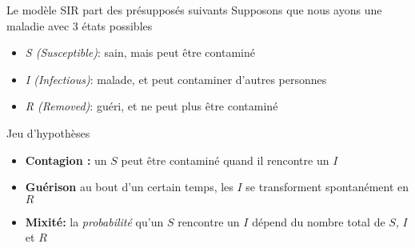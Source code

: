 \documentclass[10pt]{beamer}
\begin{document}
\begin{frame}{Le modèle SIR part des présupposés suivants}
  Supposons que nous ayons une maladie avec 3 états possibles
    \begin{itemize}
      \item \emph{S (Susceptible)}: sain, mais peut être contaminé
      \item \emph{I (Infectious)}: malade, et peut contaminer d'autres personnes
      \item \emph{R (Removed)}: guéri, et ne peut plus être contaminé
    \end{itemize}

  \vspace{.5cm}
  \begin{block}{Jeu d'hypothèses}
    \begin{itemize}
      \item \textbf{Contagion :} un $S$ peut être contaminé quand il rencontre un $I$
      \item \textbf{Guérison} au bout d'un certain temps, les $I$ se transforment spontanément en $R$
      \item \textbf{Mixité:} la \emph{probabilité} qu'un $S$ rencontre un $I$ dépend du nombre total
        de $S$, $I$ et $R$
    \end{itemize}
  \end{block}
\end{frame}
\end{document}
